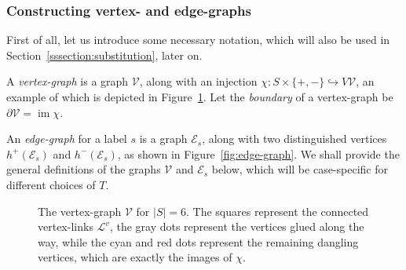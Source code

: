 \documentclass[ALCO,ThmDefs,Unicode,epreuves]{cedram}
\newcommand{\cL}{\mathcal{L}}
\newcommand{\cV}{\mathcal{V}}
\newcommand{\cE}{\mathcal{E}}
\DeclareMathOperator{\im}{im}
\begin{document}
\subsubsection{Constructing vertex- and edge-graphs}\label{sssection:edge-and-vertex-graphs}

First of all, let us introduce some necessary notation, which will also be used in Section~\ref{sssection:substitution}, later on.
 
A \emph{vertex-graph} is a graph $\cV$, along with an injection $\chi : S\times\{+,-\} \hookrightarrow V\cV$, an example of which is depicted in Figure~\ref{fig:vertex-graph-5gen}. Let the \emph{boundary} of a vertex-graph be $\partial \cV = \im \chi$. 

An \emph{edge-graph} for a label $s$ is a graph $\cE_s$, along with two distinguished vertices $h^{+}(\cE_s)$ and $h^{-}(\cE_s)$, as shown in Figure~\ref{fig:edge-graph}. We shall provide the general definitions of the graphs $\cV$ and $\cE_s$ below, which will be case-specific for different choices of $T$. 

\begin{figure}[htb]
\centering


\caption{The vertex-graph $\cV$ for $|S|=6$. The squares represent the connected vertex-links $\cL^v$, the gray dots represent the vertices glued along the way, while the cyan and red dots represent the remaining dangling vertices, which are exactly the images of $\chi$.}\label{fig:vertex-graph-5gen}
\end{figure}
\end{document}
